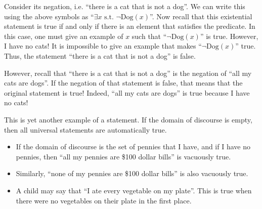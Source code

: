 Consider its negation, i.e. ``there is a cat that is not a dog''. We can write this using the above symbols as ``$\exists x \text{ s.t. } \lnot \mathrm{Dog}(x)$''. Now recall that this existential statement is true if and only if there is an element that satisfies the predicate. In this case, one must give an example of $x$ such that ``$\lnot \mathrm{Dog}(x)$'' is true. However, I have no cats! It is impossible to give an example that makes ``$\lnot \mathrm{Dog}(x)$'' true. Thus, the statement ``there is a cat that is not a dog'' is false.

However, recall that ``there is a cat that is not a dog'' is the negation of ``all my cats are dogs''. If the negation of that statement is false, that means that the original statement is true! Indeed, ``all my cats are dogs'' is true because I have no cats!

This is yet another example of a  statement. If the domain of discourse is empty, then all universal statements are automatically true.

\begin{example}
    \begin{itemize}[leftmargin=*]
        \item If the domain of discourse is the set of pennies that I have, and if I have no pennies, then ``all my pennies are \$100 dollar bills'' is vacuously true.
        \item Similarly, ``none of my pennies are \$100 dollar bills'' is also vacuously true.
        \item A child may say that ``I ate every vegetable on my plate''. This is true when there were no vegetables on their plate in the first place.
    \end{itemize}
\end{example}

